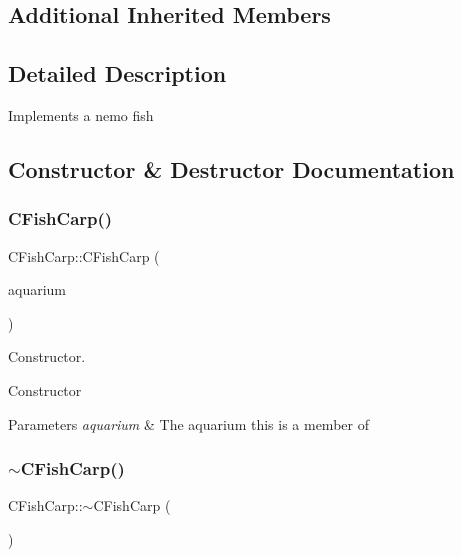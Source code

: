 \subsection*{Additional Inherited Members}


\subsection{Detailed Description}
Implements a nemo fish 

\subsection{Constructor \& Destructor Documentation}
\mbox{\label{class_c_fish_carp_a9bc5ff482658f5b8f09e6d71a143a3e8}} 
\subsubsection{\texorpdfstring{C\+Fish\+Carp()}{CFishCarp()}}
{\footnotesize\ttfamily C\+Fish\+Carp\+::\+C\+Fish\+Carp (\begin{DoxyParamCaption}\item[{\hyperlink{class_c_aquarium}{C\+Aquarium} $\ast$}]{aquarium }\end{DoxyParamCaption})}



Constructor. 

Constructor 
\begin{DoxyParams}{Parameters}
{\em aquarium} & The aquarium this is a member of \\
\hline
\end{DoxyParams}
\mbox{\label{class_c_fish_carp_a5f223a99f88b027ac08287ca18f31444}} 
\subsubsection{\texorpdfstring{$\sim$\+C\+Fish\+Carp()}{~CFishCarp()}}
{\footnotesize\ttfamily C\+Fish\+Carp\+::$\sim$\+C\+Fish\+Carp (\begin{DoxyParamCaption}{ }\end{DoxyParamCaption})\hspace{0.3cm}{\ttfamily [virtual]}}




